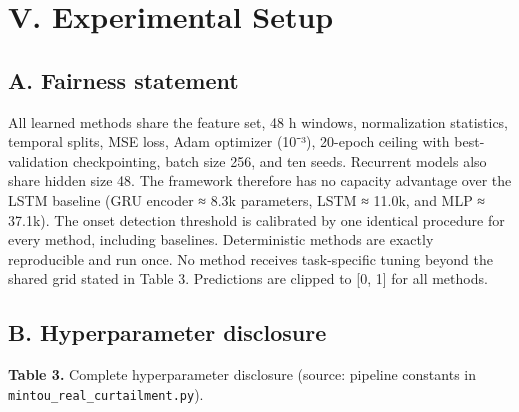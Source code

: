 \documentclass[
  10pt,
  a4paper,
]{article}
\begin{document}
\section{V. Experimental Setup}\label{v.-experimental-setup}

\subsection{A. Fairness statement}\label{a.-fairness-statement}

All learned methods share the feature set, 48 h windows, normalization
statistics, temporal splits, MSE loss, Adam optimizer (10⁻³), 20-epoch
ceiling with best-validation checkpointing, batch size 256, and ten
seeds. Recurrent models also share hidden size 48. The framework
therefore has no capacity advantage over the LSTM baseline (GRU encoder
≈ 8.3k parameters, LSTM ≈ 11.0k, and MLP ≈ 37.1k). The onset detection
threshold is calibrated by one identical procedure for every method,
including baselines. Deterministic methods are exactly reproducible and
run once. No method receives task-specific tuning beyond the shared grid
stated in Table 3. Predictions are clipped to {[}0, 1{]} for all
methods.

\subsection{B. Hyperparameter
disclosure}\label{b.-hyperparameter-disclosure}

\textbf{Table 3.} Complete hyperparameter disclosure (source: pipeline
constants in \texttt{mintou\_real\_curtailment.py}).
\end{document}
